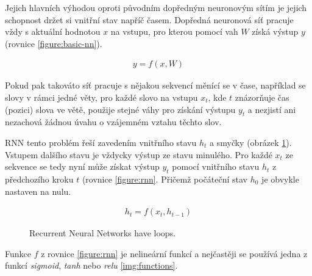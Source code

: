Jejich hlavních výhodou oproti původním dopředným neuronovým sítím je jejich schopnost držet si vnitřní stav napříč časem. Dopředná neuronová síť pracuje vždy s aktuální hodnotou $x$ na vstupu, pro kterou pomocí vah $W$ získá výstup $y$ (rovnice \ref{figure:basic-nn}).

\begin{align}\label{figure:basic-nn}
  y = f (x, W)
\end{align}

Pokud pak takováto síť pracuje s nějakou sekvencí měnící se v čase, například se slovy v rámci jedné věty, pro každé slovo na vstupu $x_t$, kde $t$ znázorňuje čas (pozici) slova ve větě, použije stejné váhy pro získání výstupu $y_t$ a nezjistí ani nezachová žádnou úvahu o vzájemném vztahu těchto slov.

RNN tento problém řeší zavedením vnitřního stavu $h_t$ a smyčky (obrázek \ref{img:rnn-rolled}). Vstupem dalšího stavu je vždycky výstup ze stavu minulého. Pro každé $x_t$ ze sekvence se tedy nyní může získat výstup $y_t$ pomocí vnitřního stavu $h_t$ z předchozího kroku $t$ (rovnice \ref{figure:rnn}. Přičemž počáteční stav  $h_0$ je obvykle nastaven na nulu.

\begin{align}\label{figure:rnn}
  h_t = f (x_t, h_{t-1})
\end{align}

\begin{figure}[h]
    \begin{center}
    \end{center}
	\caption{Recurrent Neural Networks have loops. }
	\label{img:rnn-rolled}
\end{figure}

Funkce $f$ z rovnice \ref{figure:rnn} je nelineární funkcí a nejčastěji se používá jedna z funkcí \emph{sigmoid}, \emph{tanh} nebo \emph{relu} \ref{img:functions}. 

